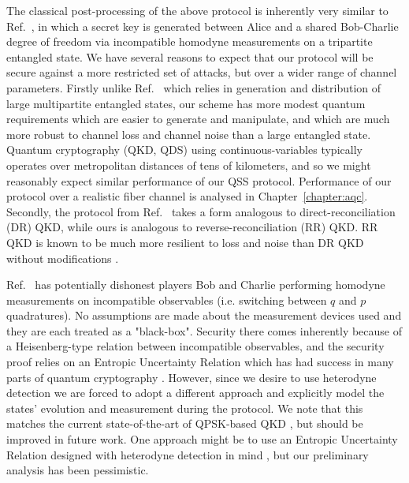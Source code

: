 The classical post-processing of the above protocol is inherently very similar to Ref.~\cite{Kogias2017}, in which a secret key is generated between Alice and a shared Bob-Charlie degree of freedom via incompatible homodyne measurements on a tripartite entangled state. We have several reasons to expect that our protocol will be secure against a more restricted set of attacks, but over a wider range of channel parameters.  Firstly unlike Ref.~\cite{Kogias2017} which relies in generation and distribution of large multipartite entangled states, our scheme has more modest quantum requirements which are easier to generate and manipulate, and which are much more robust to channel loss and channel noise than a large entangled state. Quantum cryptography (QKD, QDS) using continuous-variables typically operates over metropolitan distances of tens of kilometers, and so we might reasonably expect similar performance of our QSS protocol. Performance of our protocol over a realistic fiber channel is analysed in Chapter~\ref{chapter:aqc}. Secondly, the protocol from Ref.~\cite{Kogias2017} takes a form analogous to direct-reconciliation (DR) QKD, while ours is analogous to reverse-reconciliation (RR) QKD. RR QKD is known \cite{Grosshans2002, Grosshans2003, Laudenbach2017} to be much more resilient to loss and noise than DR QKD without modifications \cite{Silberhorn2002}.

Ref.~\cite{Kogias2017} has potentially dishonest players Bob and Charlie performing homodyne measurements on incompatible observables (i.e. switching between $q$ and $p$ quadratures). No assumptions are made about the measurement devices used and they are each treated as a "black-box". Security there comes inherently because of a Heisenberg-type relation between incompatible observables, and the security proof relies on an Entropic Uncertainty Relation which has had success in many parts of quantum cryptography \cite{Furrer2012, Furrer2017}. However, since we desire to use heterodyne detection we are forced to adopt a different approach and explicitly model the states' evolution and measurement during the protocol. We note that this matches the current state-of-the-art of QPSK-based QKD \cite{Papanastasiou2018}, but should be improved in future work. One approach might be to use an Entropic Uncertainty Relation designed with heterodyne detection in mind \cite{DePalma2017i, DePalma2017}, but our preliminary analysis has been pessimistic.

